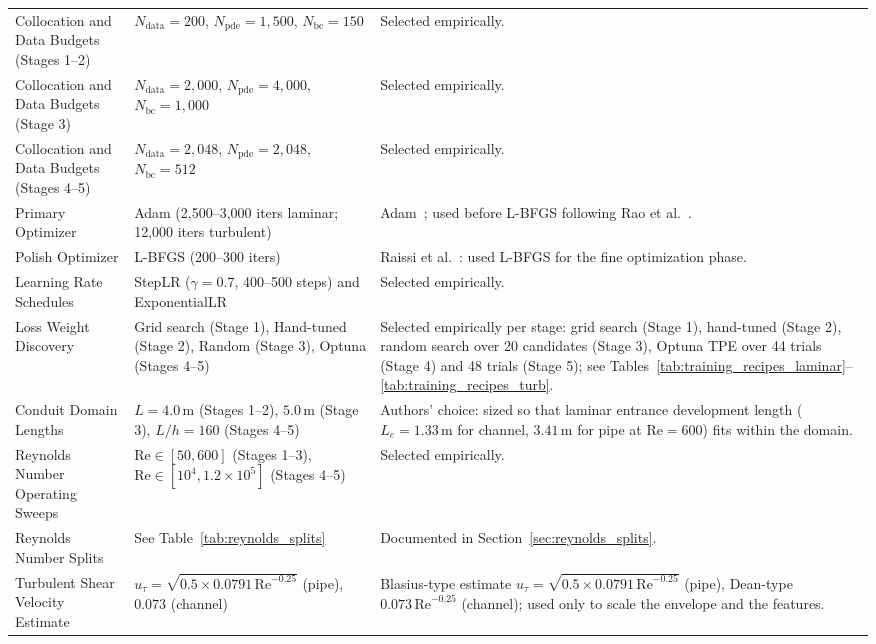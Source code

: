 \documentclass[11pt,a4paper]{article}
\begin{document}
\begin{table}[H]
{\begin{tabular}{lp{5.5cm}p{10.0cm}}
Collocation and Data Budgets (Stages 1--2) & $N_{\mathrm{data}} = 200$, $N_{\mathrm{pde}} = 1,500$, $N_{\mathrm{bc}} = 150$ & Selected empirically. \\
Collocation and Data Budgets (Stage 3) & $N_{\mathrm{data}} = 2,000$, $N_{\mathrm{pde}} = 4,000$, $N_{\mathrm{bc}} = 1,000$ & Selected empirically. \\
Collocation and Data Budgets (Stages 4--5) & $N_{\mathrm{data}} = 2,048$, $N_{\mathrm{pde}} = 2,048$, $N_{\mathrm{bc}} = 512$ & Selected empirically. \\
Primary Optimizer & Adam (2,500--3,000 iters laminar; 12,000 iters turbulent) & Adam~\cite[Sec.~2, Algorithm~1, p.~2]{kingma2015}; used before L-BFGS following Rao et al.~\cite[Sec.~3.1, p.~3]{rao2020}. \\
Polish Optimizer & L-BFGS (200--300 iters) & Raissi et al.~\cite[Sec.~2.1, p.~6]{raissi2019}: used L-BFGS for the fine optimization phase. \\
Learning Rate Schedules & StepLR ($\gamma=0.7$, 400--500 steps) and ExponentialLR & Selected empirically. \\
Loss Weight Discovery & Grid search (Stage 1), Hand-tuned (Stage 2), Random (Stage 3), Optuna (Stages 4--5) & Selected empirically per stage: grid search (Stage 1), hand-tuned (Stage 2), random search over 20 candidates (Stage 3), Optuna TPE over 44 trials (Stage 4) and 48 trials (Stage 5); see Tables~\ref{tab:training_recipes_laminar}--\ref{tab:training_recipes_turb}. \\
Conduit Domain Lengths & $L = 4.0\,\text{m}$ (Stages 1--2), $5.0\,\text{m}$ (Stage 3), $L/h = 160$ (Stages 4--5) & Authors' choice: sized so that laminar entrance development length ($L_e = 1.33\,\text{m}$ for channel, $3.41\,\text{m}$ for pipe at $\mathrm{Re}=600$) fits within the domain. \\
Reynolds Number Operating Sweeps & $\mathrm{Re} \in [50, 600]$ (Stages 1--3), $\mathrm{Re} \in [10^4, 1.2\times 10^5]$ (Stages 4--5) & Selected empirically. \\
Reynolds Number Splits & See Table~\ref{tab:reynolds_splits} & Documented in Section~\ref{sec:reynolds_splits}. \\
Turbulent Shear Velocity Estimate & $u_\tau = \sqrt{0.5 \times 0.0791\,\mathrm{Re}^{-0.25}}$ (pipe), $0.073$ (channel) & Blasius-type estimate $u_\tau=\sqrt{0.5\times0.0791\,\mathrm{Re}^{-0.25}}$ (pipe), Dean-type $0.073\,\mathrm{Re}^{-0.25}$ (channel); used only to scale the envelope and the features. \\

\end{tabular}}
\end{table}
\end{document}
